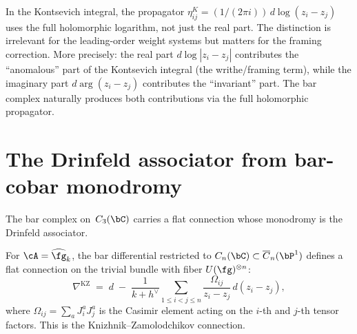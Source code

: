 \begin{remark}\label{rem:imaginary-part}
In the Kontsevich integral, the propagator
$\eta^K_{ij} = (1/(2\pi i))\, d\log(z_i - z_j)$
uses the full holomorphic logarithm, not just the real part.
The distinction is irrelevant for the leading-order weight systems
but matters for the framing correction. More precisely:
the real part $d\log|z_i-z_j|$ contributes the ``anomalous'' part
of the Kontsevich integral (the writhe/framing term), while the
imaginary part $d\arg(z_i-z_j)$ contributes the ``invariant'' part.
The bar complex naturally produces both contributions via the
full holomorphic propagator.
\end{remark}


\section{The Drinfeld associator from bar-cobar monodromy}
\label{sec:drinfeld-associator}

The bar complex on~$C_3(\bC)$ carries a flat connection whose monodromy is the Drinfeld associator.

\begin{proposition}
\label{prop:kz-from-bar}
For $\cA = \widehat{\fg}_k$, the bar differential restricted to
$C_n(\bC) \subset \overline{C}_n(\bP^1)$ defines a flat connection
on the trivial bundle with fiber $U(\fg)^{\otimes n}$:
\begin{equation}\label{eq:kz-connection}
\nabla^{\mathrm{KZ}}
\;=\;
d \;-\; \frac{1}{k+h^\vee}
\sum_{1 \leq i < j \leq n}
\frac{\Omega_{ij}}{z_i - z_j}\, d(z_i - z_j),
\end{equation}
where $\Omega_{ij} = \sum_a J^a_i J^a_j$ is the Casimir element
acting on the $i$-th and $j$-th tensor factors. This is the
Knizhnik--Zamolodchikov connection.
\end{proposition}


